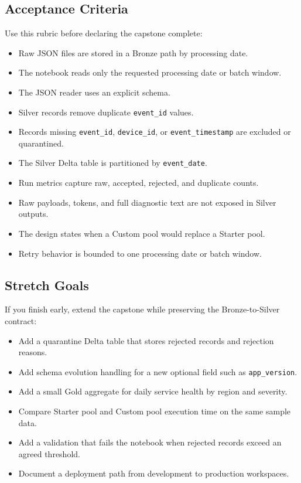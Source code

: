 \subsection*{Acceptance Criteria}
Use this rubric before declaring the capstone complete:
\begin{itemize}
    \item[\(\square\)] Raw JSON files are stored in a Bronze path by processing date.
    \item[\(\square\)] The notebook reads only the requested processing date or batch window.
    \item[\(\square\)] The JSON reader uses an explicit schema.
    \item[\(\square\)] Silver records remove duplicate \texttt{event\_id} values.
    \item[\(\square\)] Records missing \texttt{event\_id}, \texttt{device\_id}, or \texttt{event\_timestamp} are excluded or quarantined.
    \item[\(\square\)] The Silver Delta table is partitioned by \texttt{event\_date}.
    \item[\(\square\)] Run metrics capture raw, accepted, rejected, and duplicate counts.
    \item[\(\square\)] Raw payloads, tokens, and full diagnostic text are not exposed in Silver outputs.
    \item[\(\square\)] The design states when a Custom pool would replace a Starter pool.
    \item[\(\square\)] Retry behavior is bounded to one processing date or batch window.
\end{itemize}

\subsection*{Stretch Goals}
If you finish early, extend the capstone while preserving the Bronze-to-Silver contract:
\begin{itemize}
    \item Add a quarantine Delta table that stores rejected records and rejection reasons.
    \item Add schema evolution handling for a new optional field such as \texttt{app\_version}.
    \item Add a small Gold aggregate for daily service health by region and severity.
    \item Compare Starter pool and Custom pool execution time on the same sample data.
    \item Add a validation that fails the notebook when rejected records exceed an agreed threshold.
    \item Document a deployment path from development to production workspaces.
\end{itemize}
